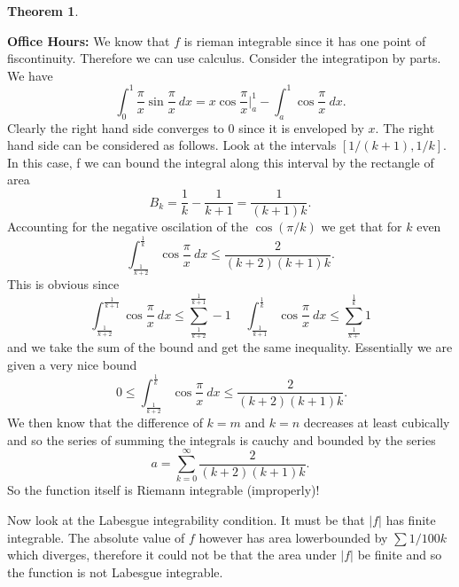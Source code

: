 \documentclass[letter]{article}
\newtheorem{theorem}{Theorem}
\newenvironment{menumerate}{%
  \edef\backupindent{\the\parindent}%
  \enumerate%
  \setlength{\parindent}{\backupindent}%
}{\endenumerate}
\begin{document}
\begin{menumerate}
\begin{theorem}
    \end{theorem}
    \textbf{Office Hours:} We know that $f$ is rieman integrable since it has one point of fiscontinuity. Therefore we can use calculus.
    Consider the integratipon by parts. We have
    \begin{equation}
    	\int_0^1 \frac{\pi}{x}\sin \frac{\pi}{x}\ dx = x \cos \frac{\pi}{x} |^1_a  - \int_a^1 \cos \frac{\pi}{x}\ dx.
    \end{equation}
    Clearly the right hand side converges to $0$ since it is enveloped by $x.$ The right hand side can be considered as follows.
    Look at the intervals $[1/(k+1), 1/k]$. In this case,  f
    we can bound the integral along this interval by the rectangle of area
    \begin{equation}
    	B_k = \frac{1}{k} - \frac{1}{k+1} = \frac{1}{(k+1)k}.
    \end{equation}
    Accounting for the negative oscilation of the $\cos(\pi/k)$ we get that for $k$ even
    \begin{equation}
    	\int_{\frac{1}{k+2}}^\frac{1}{k} \cos\frac {\pi}{x}\ dx \leq \frac{2}{(k+2)(k+1)k}. 
    \end{equation}
    This is obvious since
    \begin{equation}
    	\int_{\frac{1}{k+2}}^{\frac{1}{k+1}} \cos\frac{\pi}{x}\ dx \leq \sum_{\frac{1}{k+2}}^\frac{1}{k+1} -1\;\;\;\;
    	\int_{\frac{1}{k+1}}^{\frac{1}{k}} \cos\frac{\pi}{x}\ dx \leq \sum_{\frac{1}{k+}}^\frac{1}{k} 1
    \end{equation}
    and we take the sum of the bound and get the same inequality. Essentially we are given a very nice bound
    \begin{equation}
    	\ 0 \leq \int_{\frac{1}{k+2}}^\frac{1}{k} \cos \frac{\pi}{x}\ dx
    	 \leq \frac{2}{(k+2)(k+1)k}.
    \end{equation}
    We then know that the difference of $k=m$ and $k=n$ decreases at least cubically and
    so the series of summing the integrals is cauchy and bounded by the series
    \begin{equation}
    	a = \sum_{k=0}^\infty \frac{2}{(k+2)(k+1)k}.
    \end{equation}
    So the function itself is Riemann integrable (improperly)!

    Now look at the Labesgue integrability condition. It must be that $|f|$ has finite integrable. The absolute value of $f$
    however has area lowerbounded by $\sum 1/100k$ which diverges, therefore it could not be that the area under $|f|$ be finite
    and so the function is not Labesgue integrable. 


\end{menumerate}
\end{document}

